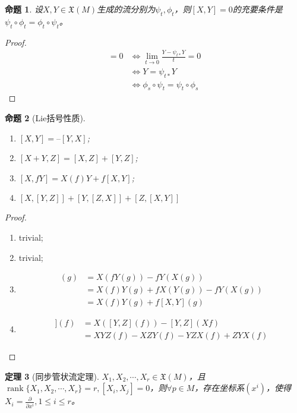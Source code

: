 \documentclass[winfonts,UTF8,c5size,a4paper,fancyhdr,hyperref,titlepage,nocap]{ctexart}
\newtheorem{thm}{定理}
\newtheorem{prop}[thm]{命题}
\theoremstyle{definition}
\theoremstyle{remark}
\numberwithin{equation}{subsection}
\newcommand{\pfrac}[2]{\frac{\partial{#1}}{\partial{#2}}}
\newcommand{\rank}{\operatorname{rank}}
\newcommand{\Xf}[1]{\mathfrak{X}(#1)}
\begin{document}
\begin{prop}
  设$X,Y\in\Xf{M}$生成的流分别为$\psi_t,\phi_t$，则$[X,Y]=0$的充要条件是$\psi_t\circ\phi_t=\phi_t\circ\psi_t$。
\end{prop}
\begin{proof}
\begin{align*}
  [X,Y]=0&\Longleftrightarrow\lim_{t\to0}\frac{Y-\psi_{t\ast}Y}{t}=0\\
       &\Longleftrightarrow Y=\psi_{t\ast}Y\\
       &\Longleftrightarrow \phi_s\circ\psi_t=\psi_t\circ\phi_s
\end{align*}
\end{proof}
\begin{prop}[Lie括号性质]
\begin{enumerate}[1)]
    \setlength{\itemindent}{2ex}
    \item $[X,Y]=–[Y,X]$;
    \item $[X+Y,Z]=[X,Z]+[Y,Z]$;
    \item $[X,fY]=X(f)Y+f[X,Y]$;
    \item $[X,[Y,Z]]+[Y,[Z,X]]+[Z,[X,Y]]$
\end{enumerate}
\end{prop}
\begin{proof}
  \begin{enumerate}[1)]
    \setlength{\itemindent}{2ex}
    \item trivial;
    \item trivial;
    \item \begin{align*}
[X,fY](g)&=X(fY(g))-fY(X(g))\\
         &=X(f)Y(g)+fX(Y(g))-fY(X(g))\\
         &=X(f)Y(g)+f[X,Y](g)
          \end{align*}
    \item \begin{align*}
[X,[Y,Z]](f)&=X([Y,Z](f))-[Y,Z](Xf)\\
            &=XYZ(f)-XZY(f)-YZX(f)+ZYX(f)
                                         \end{align*}
  \end{enumerate}
\end{proof}
\begin{thm}[同步管状流定理]
$X_1,X_2,\cdots,X_r\in\Xf{M}$，且$\rank\{X_1,X_2,\cdots,X_r\}=r, [X_i,X_j]=0$，则$\forall p\in M$，存在坐标系$(x^i)$，使得$X_i=\pfrac{}{x^i},1\leqslant i\leqslant r$。
\end{thm}
\end{document}
